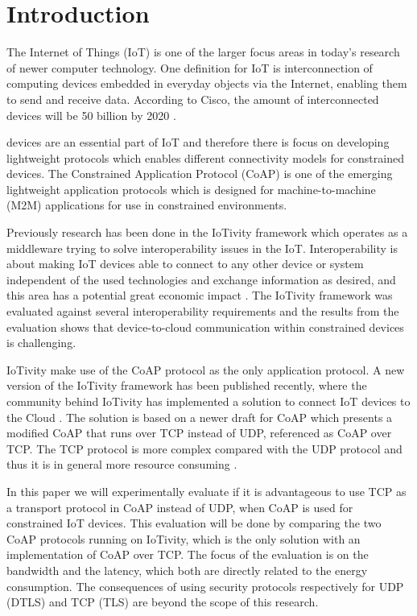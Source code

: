 \section{Introduction}{\label{sec:intro}}
The Internet of Things (IoT) is one of the larger focus areas in today's research of newer computer technology. One definition for IoT is interconnection of computing devices embedded in everyday objects via the Internet, enabling them to send and receive data. According to Cisco, the amount of interconnected devices will be 50 billion by 2020 \cite{ciscoiot:online} \cite{Inter74:online}.

 devices are an essential part of IoT and therefore there is focus on developing lightweight protocols which enables different connectivity models for constrained devices.  
The Constrained Application Protocol (CoAP) \cite{rfc7252} is one of the emerging lightweight application protocols which is designed for machine-to-machine (M2M) applications for use in constrained environments.   

Previously research has been done \cite{interoperabilityChallenge} in the IoTivity framework which operates as a middleware trying to solve interoperability issues in the IoT. Interoperability is about making IoT devices able to connect to any other device or system independent of the used technologies and exchange information as desired, and this area has a potential great economic impact \cite{Unloc34:online}. The IoTivity framework was evaluated against several interoperability requirements and the results from the evaluation shows that device-to-cloud communication within constrained devices is challenging.

IoTivity make use of the CoAP protocol as the only application protocol. 
A new version of the IoTivity framework has been published recently, where the community behind IoTivity has implemented a solution to connect IoT devices to the Cloud \cite{IoTiv3:online}. The solution is based on a newer draft for CoAP \cite{ietf-core-coap-tcp-tls-02} which presents a modified CoAP that runs over TCP instead of UDP, referenced as CoAP over TCP.
The TCP protocol is more complex compared with the UDP protocol and thus it is in general more resource consuming \cite{giannoulis2009tcp}.


In this paper we will experimentally evaluate if it is advantageous to use TCP as a transport protocol in CoAP instead of UDP, when CoAP is used for constrained IoT devices.
This evaluation will be done by comparing the two CoAP protocols running on IoTivity, which is the only solution with an implementation of CoAP over TCP. The focus of the evaluation is on the bandwidth and the latency, which both are directly related to the energy consumption. The consequences of using security protocols respectively for UDP (DTLS) and TCP (TLS) are beyond the scope of this research.

